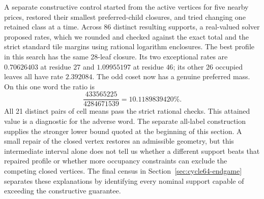 A separate constructive control started from the active vertices for five nearby prices, restored their smallest preferred-child closures, and tried changing one retained class at a time. Across 86 distinct resulting supports, a real-valued solver proposed rates, which we rounded and checked against the exact total and the strict standard tile margins using rational logarithm enclosures. The best profile in this search has the same 28-leaf closure. Its two exceptional rates are \(0.70626403\) at residue \(27\) and \(1.09955197\) at residue \(46\); its other 26 occupied leaves all have rate \(2.392084\). The odd coset now has a genuine preferred mass. On this one word the ratio is
\[
 \frac{433565225}{4284671539}=10.1189839420\%.
\]
All 21 distinct pairs of cell means pass the strict rational checks. This attained value is a diagnostic for the adverse word. The separate all-label construction supplies the stronger lower bound quoted at the beginning of this section. A small repair of the closed vertex restores an admissible geometry, but this intermediate interval alone does not tell us whether a different support beats that repaired profile or whether more occupancy constraints can exclude the competing closed vertices. The final census in Section~\ref{sec:cycle64-endgame} separates these explanations by identifying every nominal support capable of exceeding the constructive guarantee.
